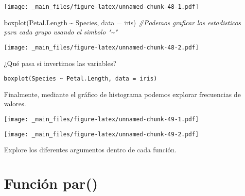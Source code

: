 \documentclass[
]{book}
\newenvironment{Shaded}{\begin{snugshade}}{\end{snugshade}}
\newcommand{\AttributeTok}[1]{\textcolor[rgb]{0.77,0.63,0.00}{#1}}
\newcommand{\CommentTok}[1]{\textcolor[rgb]{0.56,0.35,0.01}{\textit{#1}}}
\newcommand{\FunctionTok}[1]{\textcolor[rgb]{0.00,0.00,0.00}{#1}}
\newcommand{\NormalTok}[1]{#1}
\newcommand{\SpecialCharTok}[1]{\textcolor[rgb]{0.00,0.00,0.00}{#1}}
\newcommand{\StringTok}[1]{\textcolor[rgb]{0.31,0.60,0.02}{#1}}
\begin{document}
\texttt{[image: \_main\_files/figure-latex/unnamed-chunk-48-1.pdf]}

\begin{Shaded}
\begin{Highlighting}[]
\FunctionTok{boxplot}\NormalTok{(Petal.Length }\SpecialCharTok{\textasciitilde{}}\NormalTok{ Species, }\AttributeTok{data =}\NormalTok{ iris) }\CommentTok{\#Podemos graficar los estadisticos para cada grupo usando el simbolo "\textasciitilde{}"}
\end{Highlighting}
\end{Shaded}

\texttt{[image: \_main\_files/figure-latex/unnamed-chunk-48-2.pdf]}

¿Qué pasa si invertimos las variables?

\begin{verbatim}
boxplot(Species ~ Petal.Length, data = iris)
\end{verbatim}

Finalmente, mediante el gráfico de histograma podemos explorar frecuencias de valores.

\begin{Shaded}
\end{Shaded}

\texttt{[image: \_main\_files/figure-latex/unnamed-chunk-49-1.pdf]}

\begin{Shaded}
\end{Shaded}

\texttt{[image: \_main\_files/figure-latex/unnamed-chunk-49-2.pdf]}

Explore los diferentes argumentos dentro de cada función.

\hypertarget{funciuxf3n-par}{%
\section{Función par()}\label{funciuxf3n-par}}
\end{document}
